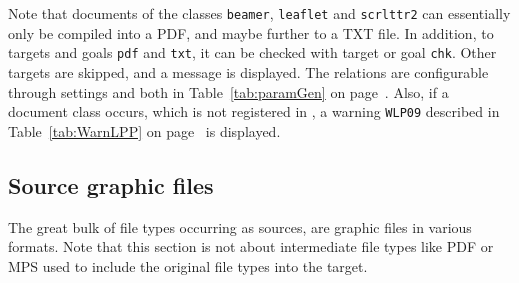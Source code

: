 


Note that documents of the classes \texttt{beamer}, \texttt{leaflet} and \texttt{scrlttr2} 
can essentially only be compiled into a PDF, 
and maybe further to a TXT file. 
In addition, to targets and goals \texttt{pdf} and \texttt{txt}, 
it can be checked with target or goal \texttt{chk}. 
Other targets are skipped, and a message is displayed. 
The relations are configurable 
through settings  and  
both in Table~\ref{tab:paramGen} on page~\pageref{tab:paramGen}. 
Also, if a document class occurs, 
which is not registered in , 
a warning \texttt{WLP09} described in Table~\ref{tab:WarnLPP} 
on page~\pageref{tab:WarnLPP} is displayed. 






\subsection{Source graphic files}\label{subsec:sourcesGraphic}

The great bulk of file types occurring as sources, 
are graphic files in various formats. 
Note that this section is not about intermediate file types like PDF or MPS 
used to include the original file types into the target. 

